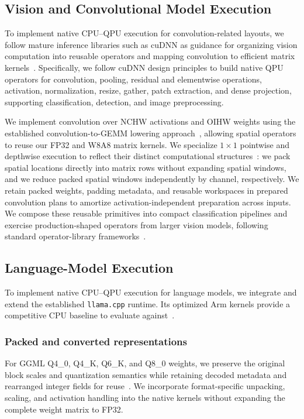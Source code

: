 \documentclass[sigplan,screen,review]{acmart}
\begin{document}
\subsection{Vision and Convolutional Model Execution}
\label{sec:dnn}

To implement native CPU--QPU execution for convolution-related layouts, we follow mature inference libraries such as cuDNN as guidance for organizing vision computation into reusable operators and mapping convolution to efficient matrix kernels~\cite{chetlur2014cudnn}. Specifically, we follow cuDNN design principles to build native QPU operators for convolution, pooling, residual and elementwise operations, activation, normalization, resize, gather, patch extraction, and dense projection, supporting classification, detection, and image preprocessing. 

We implement convolution over NCHW activations and OIHW weights using the established convolution-to-GEMM lowering approach~\cite{chetlur2014cudnn}, allowing spatial operators to reuse our FP32 and W8A8 matrix kernels. We specialize $1\times1$ pointwise and depthwise execution to reflect their distinct computational structures~\cite{howard2017mobilenets}: we pack spatial locations directly into matrix rows without expanding spatial windows, and we reduce packed spatial windows independently by channel, respectively. We retain packed weights, padding metadata, and reusable workspaces in prepared convolution plans to amortize activation-independent preparation across inputs. We compose these reusable primitives into compact classification pipelines and exercise production-shaped operators from larger vision models, following standard operator-library frameworks~\cite{chetlur2014cudnn}. 


\subsection{Language-Model Execution}
\label{sec:llm}

To implement native CPU--QPU execution for language models, we integrate and extend the established \texttt{llama.cpp} runtime. Its optimized Arm kernels provide a competitive CPU baseline to evaluate against~\cite{llamacpp}. 


\subsubsection{Packed and converted representations} 

For GGML Q4\_0, Q4\_K, Q6\_K, and Q8\_0 weights, we preserve the original block scales and quantization semantics while retaining decoded metadata and rearranged integer fields for reuse~\cite{llamacpp}. We incorporate format-specific unpacking, scaling, and activation handling into the native kernels without expanding the complete weight matrix to FP32. 
\end{document}
